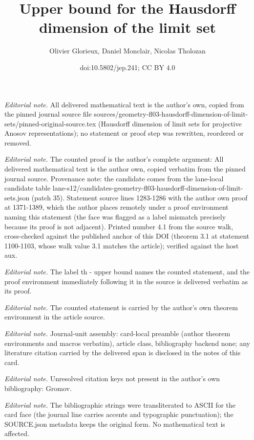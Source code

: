 \documentclass[10pt,a4paper]{article}
\title{Upper bound for the Hausdorff dimension of the limit set}
\author{Olivier Glorieux, Daniel Monclair, Nicolas Tholozan}
\date{doi:10.5802/jep.241; CC BY 4.0}
\theoremstyle{definition}
\begin{document}
\maketitle
\setcounter{section}{4}
\setcounter{theo}{0}
\noindent\textit{Editorial note.} All delivered mathematical text is the author's own, copied from the pinned journal source file sources/geometry-fl03-hausdorff-dimension-of-limit-sets/pinned-original-source.tex (Hausdorff dimension of limit sets for projective Anosov representations); no statement or proof step was rewritten, reordered or removed.\par\medskip
\noindent\textit{Editorial note.} The counted proof is the author's complete argument: All delivered mathematical text is the author own, copied verbatim from the pinned journal source. Provenance note: the candidate comes from the lane-local candidate table lane-s12/candidates-geometry-fl03-hausdorff-dimension-of-limit-sets.json (patch 35). Statement source lines 1283-1286 with the author own proof at 1371-1389, which the author places remotely under a proof environment naming this statement (the face was flagged as a label mismatch precisely because its proof is not adjacent). Printed number 4.1 from the source walk, cross-checked against the published anchor of this DOI (theorem 3.1 at statement 1100-1103, whose walk value 3.1 matches the article); verified against the host aux.\par\medskip
\noindent\textit{Editorial note.} The label th - upper bound names the counted statement, and the proof environment immediately following it in the source is delivered verbatim as its proof.\par\medskip
\noindent\textit{Editorial note.} The counted statement is carried by the author's own theorem environment in the article source.\par\medskip
\noindent\textit{Editorial note.} Journal-unit assembly: card-local preamble (author theorem environments and macros verbatim), article class, bibliography backend none; any literature citation carried by the delivered span is disclosed in the notes of this card.\par\medskip
\noindent\textit{Editorial note.} Unresolved citation keys not present in the author's own bibliography: Gromov.\par\medskip
\noindent\textit{Editorial note.} The bibliographic strings were transliterated to ASCII for the card face (the journal line carries accents and typographic punctuation); the SOURCE.json metadata keeps the original form. No mathematical text is affected.\par\medskip
\end{document}
